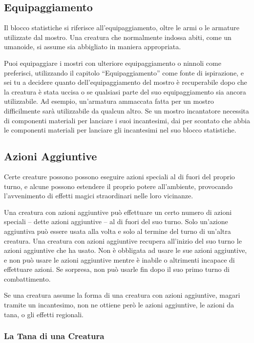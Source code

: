 \begin{multicols}{2}
\subsection{Equipaggiamento}

Il blocco statistiche si riferisce all'equipaggiamento, oltre le armi o
le armature utilizzate dal mostro. Una creatura che normalmente indossa
abiti, come un umanoide, si assume sia abbigliato in maniera
appropriata.

Puoi equipaggiare i mostri con ulteriore equipaggiamento o ninnoli come
preferisci, utilizzando il capitolo ``Equipaggiamento'' come fonte di
ispirazione, e sei tu a decidere quanto dell'equipaggiamento del mostro
è recuperabile dopo che la creatura è stata uccisa o se qualsiasi parte
del suo equipaggiamento sia ancora utilizzabile. Ad esempio, un'armatura
ammaccata fatta per un mostro difficilmente sarà utilizzabile da qualcun altro.  Se un mostro incantatore necessita di componenti  materiali per lanciare i suoi incantesimi, dai per  scontato che abbia le componenti materiali per lanciare  gli incantesimi nel suo blocco statistiche.

\subsection{Azioni Aggiuntive}

Certe creature possono  possono eseguire azioni speciali al di fuori del proprio  turno, e alcune possono estendere il proprio potere  all'ambiente, provocando l'avvenimento di effetti magici  straordinari nelle loro vicinanze.

Una creatura con azioni aggiuntive può effettuare un certo  numero di azioni speciali -- dette azioni aggiuntive -- al  di fuori del suo turno. Solo un'azione aggiuntiva può  essere usata alla volta e solo al termine del turno di  un'altra creatura. Una creatura con azioni aggiuntive recupera  all'inizio del suo turno le azioni aggiuntive che ha  usato. Non è obbligata ad usare le sue azioni aggiuntive, e non può usare le azioni aggiuntive mentre è inabile o altrimenti incapace di effettuare  azioni. Se sorpresa, non può usarle fin dopo il suo  primo turno di combattimento.

Se una creatura assume la forma di una creatura con azioni aggiuntive, magari tramite un incantesimo, non ne  ottiene però le azioni aggiuntive, le azioni da tana, o  gli effetti regionali.

\subsubsection{La Tana di una Creatura}


\end{multicols}

